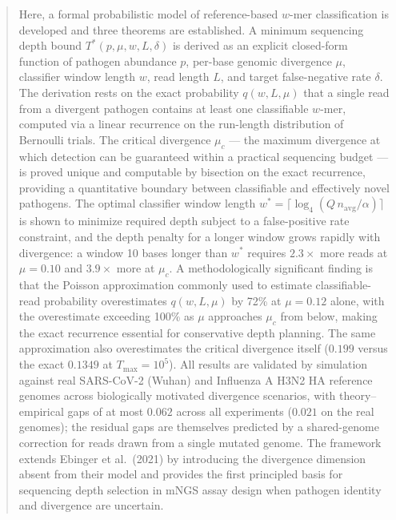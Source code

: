 \documentclass[12pt]{article}
\theoremstyle{definition}
\theoremstyle{plain}
\begin{document}
\begin{abstract}
Here, a formal probabilistic model of reference-based $w$-mer classification
is developed and three theorems are established. A minimum sequencing depth
bound $T^{*}(p,\mu,w,L,\delta)$ is derived as an explicit closed-form
function of pathogen abundance $p$, per-base genomic divergence $\mu$,
classifier window length $w$, read length $L$, and target false-negative
rate $\delta$. The derivation rests on the exact probability $q(w,L,\mu)$
that a single read from a divergent pathogen contains at least one
classifiable $w$-mer, computed via a linear recurrence on the run-length
distribution of Bernoulli trials. The critical divergence $\mu_c$ --- the
maximum divergence at which detection can be guaranteed within a practical
sequencing budget --- is proved unique and computable by bisection on the
exact recurrence, providing a quantitative boundary between classifiable and
effectively novel pathogens. The optimal classifier window length
$w^{*}=\lceil\log_4(Q\,n_{\mathrm{avg}}/\alpha)\rceil$ is shown to minimize
required depth subject to a false-positive rate constraint, and the depth
penalty for a longer window grows rapidly with divergence: a window 10
bases longer than $w^{*}$ requires $2.3\times$ more reads at $\mu=0.10$ and
$3.9\times$ more at $\mu_c$. A methodologically significant finding is that
the Poisson approximation commonly used to estimate classifiable-read
probability overestimates $q(w,L,\mu)$ by 72\% at $\mu=0.12$ alone, with the
overestimate exceeding 100\% as $\mu$ approaches $\mu_c$ from below, making
the exact recurrence essential for conservative depth planning. The same
approximation also overestimates the critical divergence itself ($0.199$
versus the exact $0.1349$ at $T_{\max}=10^5$). All results are validated by
simulation against real SARS-CoV-2 (Wuhan) and Influenza A H3N2 HA reference
genomes across biologically motivated divergence scenarios, with
theory--empirical gaps of at most $0.062$ across all experiments ($0.021$ on
the real genomes); the residual gaps are themselves predicted by a
shared-genome correction for reads drawn from a single mutated genome. The
framework extends Ebinger et al.\ (2021) by introducing the divergence
dimension absent from their model and provides the first principled basis for
sequencing depth selection in mNGS assay design when pathogen identity and
divergence are uncertain.
\end{abstract}

\newpage
\tableofcontents
\newpage

\end{document}
